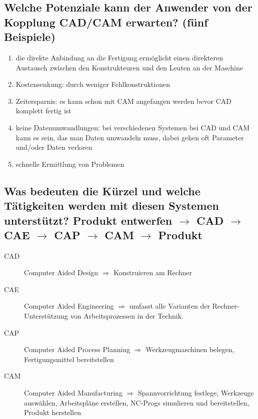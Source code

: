 \subsection*{%
    Welche Potenziale kann der Anwender von der Kopplung CAD/CAM erwarten?
    (fünf Beispiele)
}

\begin{enumerate}[1)]
    \item
        die direkte Anbindung an die Fertigung ermöglicht einen direkteren
        Austausch zwischen den Konstrukteuren und den Leuten an der Maschine
    \item
        Kostensenkung: durch weniger Fehlkonstruktionen
    \item
        Zeitersparnis: es kann schon mit CAM angefangen werden bevor CAD
        komplett fertig ist
    \item
        keine Datenumwandlungen: bei verschiedenen Systemen bei CAD und CAM
        kann es sein, das man Daten umwandeln muss, dabei gehen oft Parameter
        und/oder Daten verloren
    \item
        schnelle Ermittlung von Problemen
\end{enumerate}

\newpage

\subsection*{%
    Was bedeuten die Kürzel und welche Tätigkeiten werden mit diesen Systemen
    unterstützt?  Produkt entwerfen $\rightarrow$ CAD $\rightarrow$ CAE
    $\rightarrow$ CAP $\rightarrow$ CAM $\rightarrow$ Produkt
}

\begin{description}
    \item[CAD]
        Computer Aided Design $\Rightarrow$ Konstruieren am Rechner
    \item[CAE]
        Computer Aided Engineering $\Rightarrow$ umfasst alle Varianten der
        Rechner-Unterstützung von Arbeitsprozessen in der Technik.
    \item[CAP]
        Computer Aided Process Planning $\Rightarrow$ Werkzeugmaschinen
        belegen, Fertigungsmittel bereitstellen
    \item[CAM]
        Computer Aided Manufacturing $\Rightarrow$ Spannvorrichtung festlege,
        Werkzeuge auswählen, Arbeitspläne erstellen, NC-Progs simulieren und
        bereitstellen, Produkt herstellen
\end{description}

